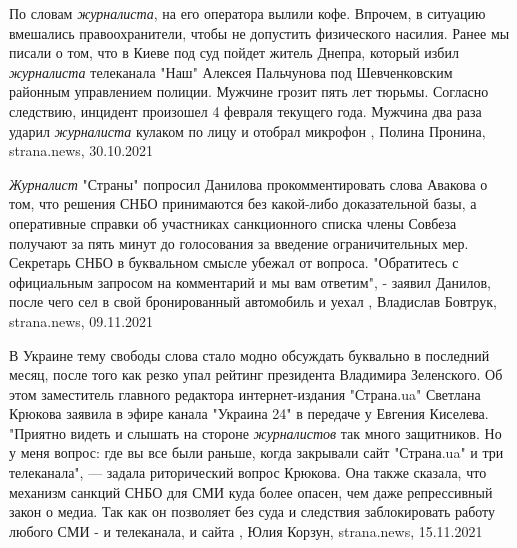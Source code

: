 {%
По словам \emph{журналиста}, на его оператора вылили кофе. Впрочем, в ситуацию
вмешались правоохранители, чтобы не допустить физического насилия.  Ранее мы
писали о том, что в Киеве под суд пойдет житель Днепра, который избил
\emph{журналиста} телеканала "Наш" Алексея Пальчунова под Шевченковским
районным управлением полиции. Мужчине грозит пять лет тюрьмы.  Согласно
следствию, инцидент произошел 4 февраля текущего года. Мужчина два раза ударил
\emph{журналиста} кулаком по лицу и отобрал микрофон
, 
Полина Пронина, strana.news, 30.10.2021

\emph{Журналист} "Страны" попросил Данилова прокомментировать слова Авакова о
том, что решения СНБО принимаются без какой-либо доказательной базы, а
оперативные справки об участниках санкционного списка члены Совбеза получают за
пять минут до голосования за введение ограничительных мер. Секретарь СНБО в
буквальном смысле убежал от вопроса.  "Обратитесь с официальным запросом на
комментарий и мы вам ответим", - заявил Данилов, после чего сел в свой
бронированный автомобиль и уехал
, 
Владислав Бовтрук, strana.news, 09.11.2021

В Украине тему свободы слова стало модно обсуждать буквально в последний месяц,
после того как резко упал рейтинг президента Владимира Зеленского.  Об этом
заместитель главного редактора интернет-издания "Страна.ua" Светлана Крюкова
заявила в эфире канала "Украина 24" в передаче у Евгения Киселева.  "Приятно
видеть и слышать на стороне \emph{журналистов} так много защитников. Но у меня
вопрос: где вы все были раньше, когда закрывали сайт "Страна.ua" и три
телеканала", — задала риторический вопрос Крюкова.  Она также сказала, что
механизм санкций СНБО для СМИ куда более опасен, чем даже репрессивный закон о
медиа. Так как он позволяет без суда и следствия заблокировать работу любого
СМИ - и телеканала, и сайта
, 
Юлия Корзун, strana.news, 15.11.2021

}

